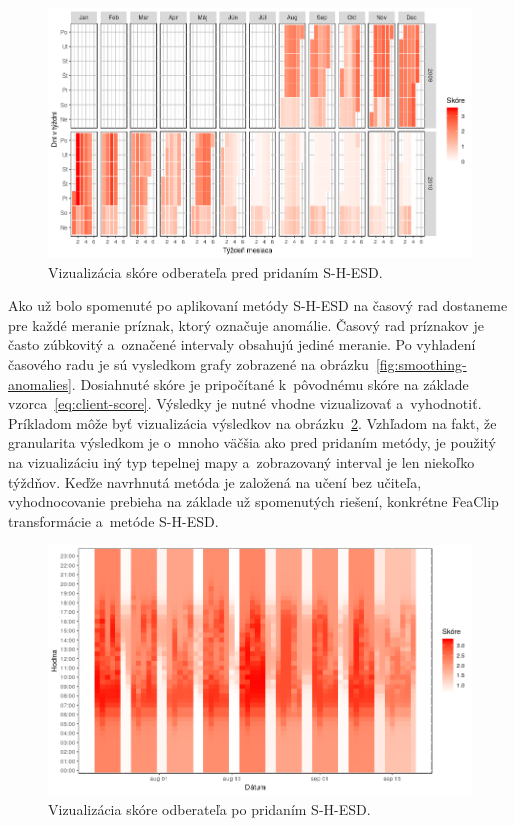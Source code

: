 \documentclass[a4paper,twoside,slovak,12pt,appendix]{article}
\begin{document}
\begin{figure}[htbp]
  \centering
  \includegraphics[width=\textwidth]{heatmap_days.png}
  \caption{Vizualizácia skóre odberateľa pred pridaním S-H-ESD.}
  \label{fig:heatmap-days}
\end{figure}

Ako už bolo spomenuté po aplikovaní metódy S-H-ESD na časový rad dostaneme pre
každé meranie príznak, ktorý označuje anomálie. Časový rad príznakov je často
zúbkovitý a~označené intervaly obsahujú jediné meranie. Po vyhladení časového
radu je sú vysledkom grafy zobrazené na obrázku~\ref{fig:smoothing-anomalies}.
Dosiahnuté skóre je pripočítané k~pôvodnému skóre na základe
vzorca~\ref{eq:client-score}. Výsledky je nutné vhodne vizualizovať
a~vyhodnotiť. Príkladom môže byť vizualizácia výsledkov na
obrázku~\ref{fig:heatmap-hours}. Vzhľadom na fakt, že granularita výsledkom je
o~mnoho väčšia ako pred pridaním metódy, je použitý na vizualizáciu iný typ
tepelnej mapy a~zobrazovaný interval je len niekoľko týždňov. Keďže navrhnutá
metóda je založená na učení bez učiteľa, vyhodnocovanie prebieha na základe už
spomenutých riešení, konkrétne FeaClip transformácie a~metóde S-H-ESD.

\begin{figure}[htbp]
  \centering
  \includegraphics[width=\textwidth]{heatmap_hours.png}
  \caption{Vizualizácia skóre odberateľa po pridaním S-H-ESD.}
  \label{fig:heatmap-hours}
\end{figure}
\end{document}
